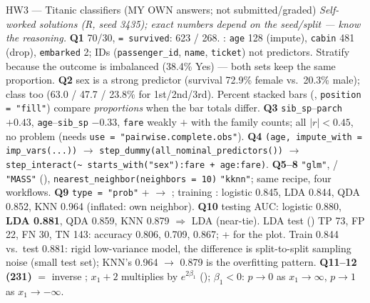 \begin{topic}{HW3 --- Titanic classifiers (MY OWN answers; not submitted/graded) }
{\color{warnc}\itshape Self-worked solutions (R, seed 3435); exact numbers depend on the seed/split --- know the reasoning.}
\textbf{Q1} 70/30,  \texttt{= survived}: 623 / 268. : \texttt{age} 128 (impute), \texttt{cabin} 481
(drop), \texttt{embarked} 2; IDs (\texttt{passenger\_id}, \texttt{name}, \texttt{ticket}) not predictors.
Stratify because the outcome is imbalanced (38.4\% Yes) --- both sets keep the same proportion.
\textbf{Q2} sex is a strong predictor (survival 72.9\% female vs.\ 20.3\% male); class too (63.0 / 47.7 / 23.8\% for
1st/2nd/3rd). Percent stacked bars (, \texttt{position = "fill"}) compare \emph{proportions} when the bar totals differ.
\textbf{Q3} \texttt{sib\_sp}--\texttt{parch} $+0.43$, \texttt{age}--\texttt{sib\_sp} $-0.33$, \texttt{fare} weakly $+$
with the family counts; all $|r|<0.45$, no  problem (needs \texttt{use = "pairwise.complete.obs"}).
\textbf{Q4} \texttt{(age, impute\_with = imp\_vars(...))} $\to$ \texttt{step\_dummy(all\_nominal\_predictors())}
$\to$ \texttt{step\_interact(\textasciitilde{} starts\_with("sex"):fare + age:fare)}.
\textbf{Q5--8}  \texttt{"glm"},  /  \texttt{"MASS"}
(), \texttt{nearest\_neighbor(neighbors = 10)} \texttt{"kknn"}; same recipe, four workflows.
\textbf{Q9}  \texttt{type = "prob"} +  $\to$ ; training : logistic 0.845, LDA 0.844, QDA 0.852, KNN 0.964 (inflated: own neighbor).
\textbf{Q10} testing AUC: logistic 0.880, \textbf{LDA 0.881}, QDA 0.859, KNN 0.879 $\Rightarrow$ LDA (near-tie).
LDA test  () TP 73, FP 22, FN 30, TN 143: accuracy 0.806,  0.709,  0.867;  +  for the plot.
Train 0.844 vs.\ test 0.881: rigid low-variance model, the difference is split-to-split sampling noise (small test
set); KNN's 0.964 $\to$ 0.879 is the overfitting pattern. \textbf{Q11--12 (231)}  $=$ inverse ;
$x_1+2$ multiplies  by $e^{2\beta_1}$ (); $\beta_1<0$: $p\to0$ as $x_1\to\infty$, $p\to1$ as $x_1\to-\infty$.
\end{topic}
